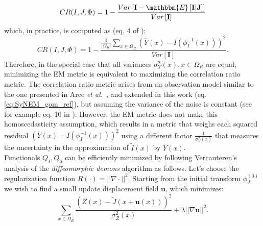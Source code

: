 \begin{equation}
    CR(I, J, \Phi) = 1 - \frac{Var\left[ \mathbf{I} - \mathbbm{E}\left[ \mathbf{I} | \mathbf{J}\right] \right]}{Var\left[ \mathbf{I} \right]}
\end{equation}
which, in practice, is computed as (eq. 4 of \cite{Roche1998}):
\begin{equation}
    CR(I, J, \Phi) = 1 - \frac{\frac{1}{|\Omega_{R}|}\sum_{x \in \Omega_{R}} \left(\overline{Y}(x) - I(\phi_{I}^{-1}(x))\right)^{2}}{Var\left[ \mathbf{I} \right]}.
\end{equation}
Therefore, in the special case that all variances $\sigma^{2}_{Y}(x), x\in\Omega_{R}$ are equal, minimizing the EM metric is equivalent to maximizing the correlation ratio metric. The correlation ratio metric arises from an observation model similar to the one presented in Arce {\it et al.}~\cite{Arce-santana2014}, and extended in this work (eq. \eqref{eq:SyNEM_gom_ref}), but assuming the variance of the noise is constant (see for example eq. 10 in \cite{Roche2000}). However, the EM metric does not make this homoscedasticity assumption, which results in a metric that weighs each squared residual $\left(\overline{Y}(x) - I(\phi_{I}^{-1}(x))\right)^{2}$ using a different factor $\frac{1}{\sigma^{2}_{Y}(x)}$ that measures the uncertainty in the approximation of $\tilde{I}(x)$ by $\overline{Y}(x)$.\\

Functionals $Q_{I}, Q_{J}$ can be efficiently minimized by following Vercauteren's analysis of the \textit{diffeomorphic demons} algorithm \cite{Vercauteren2009} as follows.
Let's choose the regularization function $R(\cdot) = ||\nabla \cdot||^{2}$. Starting from the initial transform $\phi^{(0)}_{J}$ we wish to find a small update displacement field $\mathbf{u}$, which minimizes:
\begin{equation}\label{eq:vercauteren_cost}
    \sum_{x \in \Omega_{R}} \frac{\left(\overline{Z}(x) - \tilde{J}(x + \mathbf{u}(x))\right)^{2}}{\sigma^{2}_{Z}(x)} + \lambda ||\nabla \mathbf{u}||^{2}.
\end{equation}

